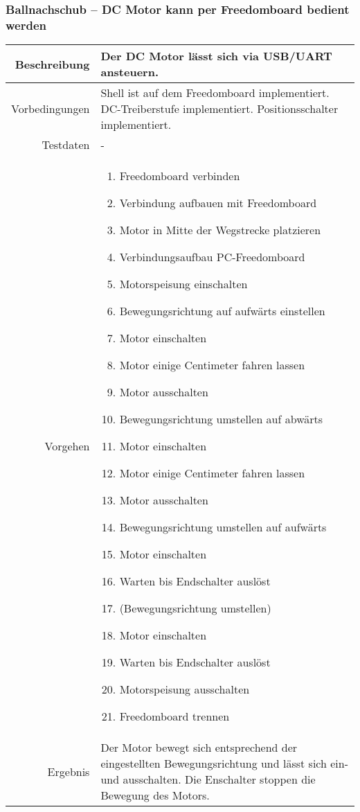 \subsubsection{Ballnachschub -- DC Motor kann per Freedomboard bedient werden}
\begin{table}[h!]
	\renewcommand{\arraystretch}{1.5}
	\begin{tabular}{|r|p{14cm}|}
		\hline Beschreibung	& Der DC Motor lässt sich via USB/UART ansteuern. \\ 
		\hline Vorbedingungen	&
			Shell ist auf dem Freedomboard implementiert.
			DC-Treiberstufe implementiert. Positionsschalter implementiert. \\ 
		\hline Testdaten	& - \\ 
		\hline Vorgehen		& 
		\begin{enumerate}
			\item Freedomboard verbinden
			\item Verbindung aufbauen mit Freedomboard
			\item Motor in Mitte der Wegstrecke platzieren 
			\item Verbindungsaufbau PC-Freedomboard
			\item Motorspeisung einschalten
			\item Bewegungsrichtung auf aufwärts einstellen
			\item Motor einschalten
			\item Motor einige Centimeter fahren lassen
			\item Motor ausschalten
			\item Bewegungsrichtung umstellen auf abwärts
			\item Motor einschalten
			\item Motor einige Centimeter fahren lassen
			\item Motor ausschalten
			\item Bewegungsrichtung umstellen auf aufwärts
			\item Motor einschalten
			\item Warten bis Endschalter auslöst
			\item (Bewegungsrichtung umstellen)
			\item Motor einschalten
			\item Warten bis Endschalter auslöst
			\item Motorspeisung ausschalten
			\item Freedomboard trennen
		\end{enumerate} \\ 
		\hline Ergebnis 	&
			Der Motor bewegt sich entsprechend der eingestellten
			Bewegungsrichtung und lässt sich ein- und ausschalten.
			Die Enschalter stoppen die Bewegung des Motors. \\ 
		\hline 
	\end{tabular}
\end{table}

